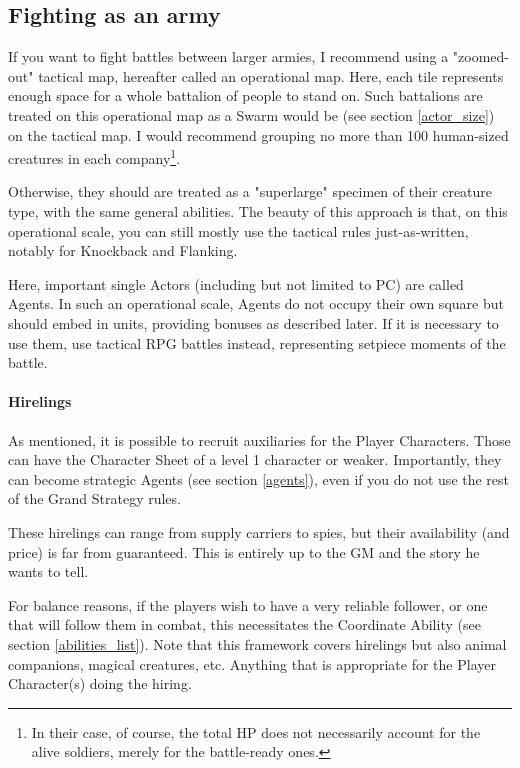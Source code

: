 \subsection{Fighting as an army}

If you want to fight battles between larger armies, I recommend using a "zoomed-out" tactical map, hereafter called an operational map. Here, each tile represents enough space for a whole battalion of people to stand on. Such battalions are treated on this operational map as a Swarm would be (see section \ref{actor_size}) on the tactical map. I would recommend grouping no more than 100 human-sized creatures in each company\footnote{In their case, of course, the total HP does not necessarily account for the alive soldiers, merely for the battle-ready ones.}.

Otherwise, they should are treated as a "superlarge" specimen of their creature type, with the same general abilities. The beauty of this approach is that, on this operational scale, you can still mostly use the tactical rules just-as-written, notably for Knockback and Flanking.

Here, important single Actors (including but not limited to PC) are called Agents. In such an operational scale, Agents do not occupy their own square but should embed in units, providing bonuses as described later. If it is necessary to use them, use tactical RPG battles instead, representing setpiece moments of the battle.


\paragraph{Hirelings}

As mentioned, it is possible to recruit auxiliaries for the Player Characters. Those can have the Character Sheet of a level 1 character or weaker. Importantly, they can become strategic Agents (see section \ref{agents}), even if you do not use the rest of the Grand Strategy rules.

These hirelings can range from supply carriers to spies, but their availability (and price) is far from guaranteed. This is entirely up to the GM and the story he wants to tell.

For balance reasons, if the players wish to have a very reliable follower, or one that will follow them in combat, this necessitates the Coordinate Ability (see section \ref{abilities_list}). Note that this framework covers hirelings but also animal companions, magical creatures, etc. Anything that is appropriate for the Player Character(s) doing the hiring.

